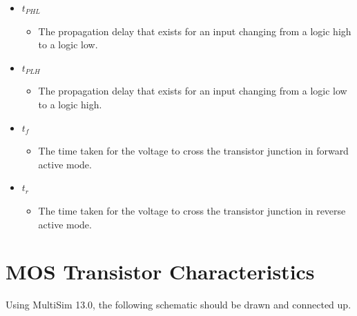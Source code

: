 \documentclass[12pt]{article}
\begin{document}
\begin{itemize}
\begin{itemize}
\end{itemize}
\item $t_{PHL}$
\begin{itemize}
\item The propagation delay that exists for an input changing from a logic high to a logic low.
\end{itemize}
\item $t_{PLH}$
\begin{itemize}
\item The propagation delay that exists for an input changing from a logic low to a logic high.
\end{itemize}
\item $t_{f}$
\begin{itemize}
\item The time taken for the voltage to cross the transistor junction in forward active mode.
\end{itemize}
\item $t_{r}$
\begin{itemize}
\item The time taken for the voltage to cross the transistor junction in reverse active mode.
\end{itemize}
\end{itemize}
\section{MOS Transistor Characteristics}
Using MultiSim 13.0, the following schematic should be drawn and connected up.
\end{document}
